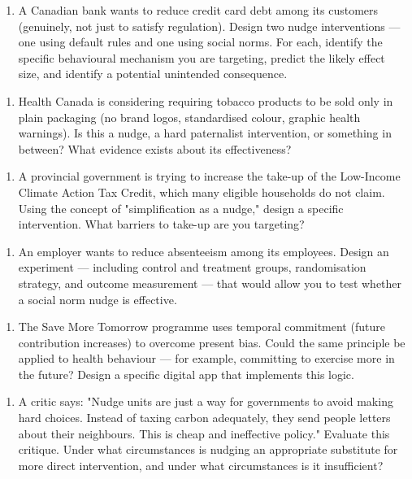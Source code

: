 \documentclass[12pt, letterpaper]{article}
\begin{document}
\begin{enumerate}
\item A Canadian bank wants to reduce credit card debt among its customers (genuinely, not just to satisfy regulation). Design two nudge interventions --- one using default rules and one using social norms. For each, identify the specific behavioural mechanism you are targeting, predict the likely effect size, and identify a potential unintended consequence.
\end{enumerate}

\begin{enumerate}
\item Health Canada is considering requiring tobacco products to be sold only in plain packaging (no brand logos, standardised colour, graphic health warnings). Is this a nudge, a hard paternalist intervention, or something in between? What evidence exists about its effectiveness?
\end{enumerate}

\begin{enumerate}
\item A provincial government is trying to increase the take-up of the Low-Income Climate Action Tax Credit, which many eligible households do not claim. Using the concept of "simplification as a nudge," design a specific intervention. What barriers to take-up are you targeting?
\end{enumerate}

\begin{enumerate}
\item An employer wants to reduce absenteeism among its employees. Design an experiment --- including control and treatment groups, randomisation strategy, and outcome measurement --- that would allow you to test whether a social norm nudge is effective.
\end{enumerate}

\begin{enumerate}
\item The Save More Tomorrow programme uses temporal commitment (future contribution increases) to overcome present bias. Could the same principle be applied to health behaviour --- for example, committing to exercise more in the future? Design a specific digital app that implements this logic.
\end{enumerate}

\begin{enumerate}
\item A critic says: "Nudge units are just a way for governments to avoid making hard choices. Instead of taxing carbon adequately, they send people letters about their neighbours. This is cheap and ineffective policy." Evaluate this critique. Under what circumstances is nudging an appropriate substitute for more direct intervention, and under what circumstances is it insufficient?
\end{enumerate}
\end{document}

